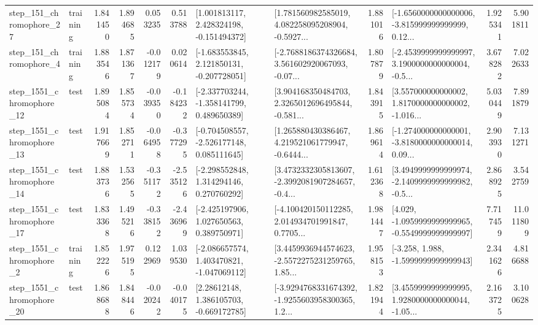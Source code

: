 \begin{tabular}{llrrrrllrlrr}
  step\_151\_chromophore\_27 &  training &      1.841450 &    1.894685 &      0.053235 &  0.513788 &    [1.001813117, 2.428324198, -0.151494372] &  [1.781560982585019, 4.082258095208904, -0.5927... &       1.881016 &  [-1.6560000000000006, -3.815999999999999, 0.12... &            1.925341 &          5.901811 \\
   step\_151\_chromophore\_4 &  training &      1.883546 &    1.871367 &     -0.012179 &  0.020614 &   [-1.683553845, 2.121850131, -0.207728051] &  [-2.7688186374326684, 3.561602920067093, -0.07... &       1.807879 &  [-2.4539999999999997, 3.1900000000000004, -0.5... &            3.678282 &          7.022633 \\
 step\_1551\_chromophore\_12 &      test &      1.895084 &    1.855734 &     -0.039350 & -0.184232 &   [-2.337703244, -1.358141799, 0.489650389] &  [3.904168350484703, 2.3265012696495844, -0.581... &       1.843915 &  [3.557000000000002, 1.8170000000000002, -1.016... &            5.030449 &          7.891879 \\
 step\_1551\_chromophore\_13 &      test &      1.917669 &    1.852711 &     -0.064958 & -0.377295 &   [-0.704508557, -2.526177148, 0.085111645] &  [1.265880430386467, 4.219521061779947, -0.6444... &       1.869614 &  [-1.274000000000001, -3.8180000000000014, 0.09... &            2.903930 &          7.131271 \\
 step\_1551\_chromophore\_14 &      test &      1.883736 &    1.532565 &     -0.351172 & -2.535126 &    [-2.298552848, 1.314294146, 0.270760292] &  [3.4732332305813607, -2.3992081907284657, -0.4... &       1.612368 &  [3.4949999999999974, -2.1409999999999982, -0.5... &            2.868925 &          3.542759 \\
 step\_1551\_chromophore\_17 &      test &      1.833368 &    1.495216 &     -0.338152 & -2.436969 &    [-2.425197906, 1.027650563, 0.389750971] &  [-4.100420150112285, 2.014934701991847, 0.7705... &       1.981447 &  [4.029, -1.0959999999999965, -0.5549999999999997] &            7.717459 &         11.011809 \\
  step\_1551\_chromophore\_2 &  training &      1.852226 &    1.975195 &      0.122969 &  1.039530 &   [-2.086657574, 1.403470821, -1.047069112] &  [3.4459936944574623, -2.5572275231259765, 1.85... &       1.958153 &               [-3.258, 1.988, -1.5999999999999943] &            2.341626 &          4.816688 \\
 step\_1551\_chromophore\_20 &      test &      1.868688 &    1.848446 &     -0.020242 & -0.040175 &     [2.28612148, 1.386105703, -0.669172785] &  [-3.9294768331674392, -1.9255603958300365, 1.2... &       1.821944 &  [3.4559999999999995, 1.9280000000000044, -1.05... &            2.163725 &          3.100628 \\

\end{tabular}

